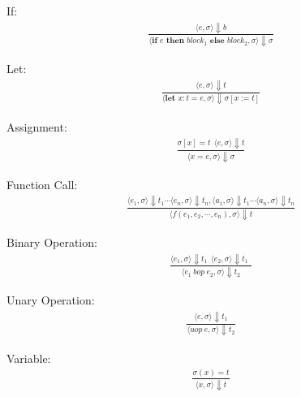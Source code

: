 \documentclass[12pt]{article}
\begin{document}
	If:
	\begin{align*}
		\frac{\langle e, \sigma \rangle\Downarrow b}
		{\langle \textbf{if } e \textbf{ then } block_1 \textbf{ else } block_2, \sigma \rangle\Downarrow \sigma}
	\end{align*}

	Let:
	\begin{align*}
		\frac{\langle e, \sigma \rangle\Downarrow t}
		{\langle \textbf{let } x: t = e, \sigma \rangle\Downarrow \sigma [x := t]}
	\end{align*}

	Assignment:
	\begin{align*}
		\frac{ \sigma[x] = t \ \ 
			\langle e, \sigma \rangle\Downarrow t}
		{\langle x = e, \sigma \rangle\Downarrow \sigma}
	\end{align*}

	Function Call: 
	{\small
  	\setlength{\abovedisplayskip}{6pt}
  	\setlength{\belowdisplayskip}{\abovedisplayskip}
  	\setlength{\abovedisplayshortskip}{0pt}
  	\setlength{\belowdisplayshortskip}{3pt}
	\begin{align*}
		\frac{
			\langle e_1, \sigma \rangle\Downarrow t_1
			\cdots
			\langle e_n, \sigma \rangle\Downarrow t_n,
			\langle a_1, \sigma \rangle\Downarrow t_1
			\cdots
			\langle a_n, \sigma \rangle\Downarrow t_n
		}
		{\langle f(e_1, e_2, \cdots, e_n), \sigma \rangle\Downarrow t}
	\end{align*}
	}%
	


	Binary Operation:
	\begin{align*}
		\frac{
			\langle e_1, \sigma \rangle\Downarrow t_1 \ \
			\langle e_2, \sigma \rangle\Downarrow t_1 \ \
		}
		{\langle e_1\ bop\ e_2, \sigma \rangle\Downarrow t_2}
	\end{align*}
	
	Unary Operation:
	\begin{align*}
		\frac{
			\langle e, \sigma \rangle\Downarrow t_1
		}
		{\langle uop\ e, \sigma \rangle\Downarrow t_2}
	\end{align*}

	Variable: 
	\begin{align*}
		\frac{
			\sigma(x) = t
		}
		{\langle x, \sigma \rangle\Downarrow t}
	\end{align*}
	
\end{document}
